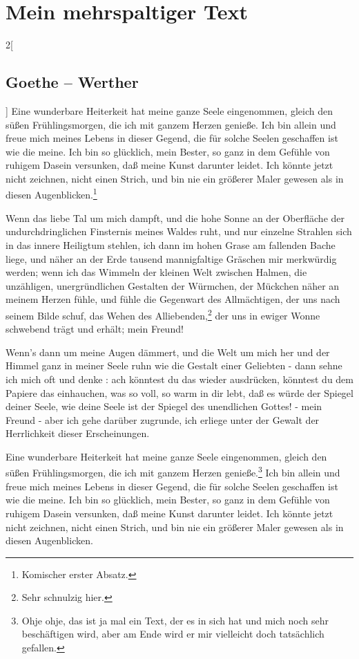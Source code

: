 
\chapter{Mein mehrspaltiger Text}


\begin{multicols}{2}[\section{Goethe – Werther}]%
Eine wunderbare Heiterkeit hat meine ganze Seele eingenommen, gleich den süßen Frühlingsmorgen, die ich mit ganzem Herzen genieße. Ich bin allein und freue mich meines Lebens in dieser Gegend, die für solche Seelen geschaffen ist wie die meine. Ich bin so glücklich, mein Bester, so ganz in dem Gefühle von ruhigem Dasein versunken, daß meine Kunst darunter leidet. Ich könnte jetzt nicht zeichnen, nicht einen Strich, und bin nie ein größerer Maler gewesen als in diesen Augenblicken.\footnote{Komischer erster Absatz.}

	Wenn das liebe Tal um mich dampft, und die hohe Sonne an der Oberfläche der undurchdringlichen Finsternis meines Waldes ruht, und nur einzelne Strahlen sich in das innere Heiligtum stehlen, ich dann im hohen Grase am fallenden Bache liege, und näher an der Erde tausend mannigfaltige Gräschen mir merkwürdig werden; wenn ich das Wimmeln der kleinen Welt zwischen Halmen, die unzähligen, unergründlichen Gestalten der Würmchen, der Mückchen näher an meinem Herzen fühle, und fühle die Gegenwart des Allmächtigen, der uns nach seinem Bilde schuf, das Wehen des Alliebenden,\footnote{Sehr schnulzig hier.} der uns in ewiger Wonne schwebend trägt und erhält; mein Freund!

Wenn's dann um meine Augen dämmert, und die Welt um mich her und der Himmel ganz in meiner Seele ruhn wie die Gestalt einer Geliebten - dann sehne ich mich oft und denke : ach könntest du das wieder ausdrücken, könntest du dem Papiere das einhauchen, was so voll, so warm in dir lebt, daß es würde der Spiegel deiner Seele, wie deine Seele ist der Spiegel des unendlichen Gottes! - mein Freund - aber ich gehe darüber zugrunde, ich erliege unter der Gewalt der Herrlichkeit dieser Erscheinungen.

Eine wunderbare Heiterkeit hat meine ganze Seele eingenommen, gleich den süßen Frühlingsmorgen, die ich mit ganzem Herzen genieße.\footnote{Ohje ohje, das ist ja mal ein Text, der es in sich hat und mich noch sehr beschäftigen wird, aber am Ende wird er mir vielleicht doch tatsächlich gefallen.} Ich bin allein und freue mich meines Lebens in dieser Gegend, die für solche Seelen geschaffen ist wie die meine. Ich bin so glücklich, mein Bester, so ganz in dem Gefühle von ruhigem Dasein versunken, daß meine Kunst darunter leidet. Ich könnte jetzt nicht zeichnen, nicht einen Strich, und bin nie ein größerer Maler gewesen als in diesen Augenblicken.


\end{multicols}
